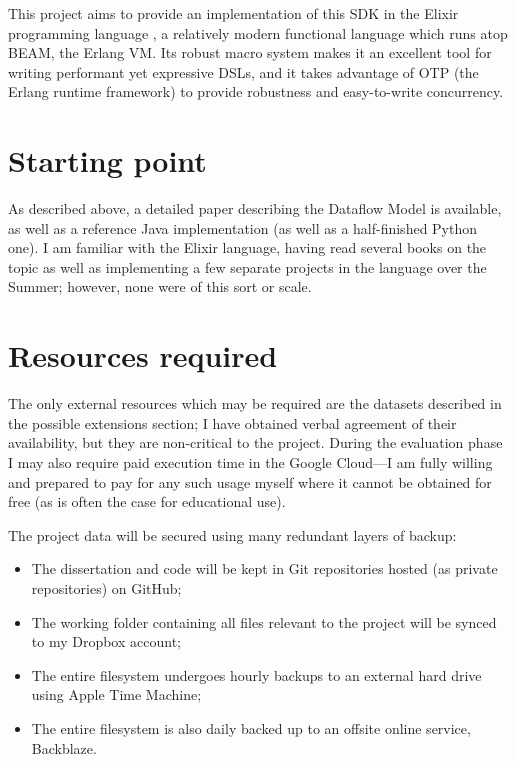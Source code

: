 This project aims to provide an implementation of this SDK in the Elixir programming language \cite{Elixir}, a relatively modern functional language which runs atop BEAM, the Erlang VM. Its robust macro system makes it an excellent tool for writing performant yet expressive DSLs, and it takes advantage of OTP (the Erlang runtime framework) to provide robustness and easy-to-write concurrency.

\section*{Starting point}

As described above, a detailed paper describing the Dataflow Model is available, as well as a reference Java implementation (as well as a half-finished Python one). I am familiar with the Elixir language, having read several books on the topic as well as implementing a few separate projects in the language over the Summer; however, none were of this sort or scale.

\section*{Resources required}

The only external resources which may be required are the datasets described in the possible extensions section; I have obtained verbal agreement of their availability, but they are non-critical to the project. During the evaluation phase I may also require paid execution time in the Google Cloud---I am fully willing and prepared to pay for any such usage myself where it cannot be obtained for free (as is often the case for educational use).

The project data will be secured using many redundant layers of backup:

\begin{itemize}
	\item The dissertation and code will be kept in Git repositories hosted (as private repositories) on GitHub;
	\item The working folder containing all files relevant to the project will be synced to my Dropbox account;
	\item The entire filesystem undergoes hourly backups to an external hard drive using Apple Time Machine;
	\item The entire filesystem is also daily backed up to an offsite online service, Backblaze.
\end{itemize}

